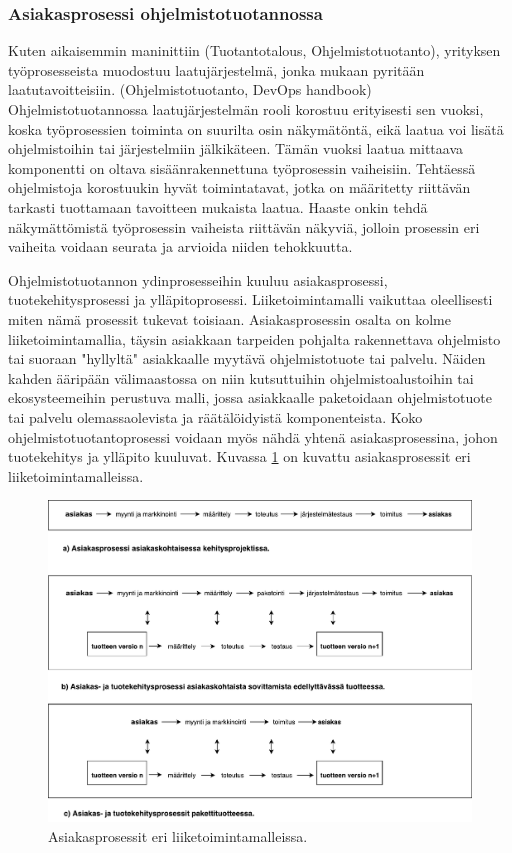\documentclass[finnish,12pt,a4paper,pdftex]{article}
\begin{document}
\subsubsection{Asiakasprosessi ohjelmistotuotannossa}

Kuten aikaisemmin maninittiin (Tuotantotalous, Ohjelmistotuotanto), yrityksen työprosesseista muodostuu laatujärjestelmä, jonka mukaan pyritään laatutavoitteisiin. (Ohjelmistotuotanto, DevOps handbook) Ohjelmistotuotannossa laatujärjestelmän rooli korostuu erityisesti sen vuoksi, koska työprosessien toiminta on suurilta osin näkymätöntä, eikä laatua voi lisätä ohjelmistoihin tai järjestelmiin jälkikäteen. Tämän vuoksi laatua mittaava komponentti on oltava sisäänrakennettuna työprosessin vaiheisiin. Tehtäessä ohjelmistoja korostuukin hyvät toimintatavat, jotka on määritetty riittävän tarkasti tuottamaan tavoitteen mukaista laatua. Haaste onkin tehdä näkymättömistä työprosessin vaiheista riittävän näkyviä, jolloin prosessin eri vaiheita voidaan seurata ja arvioida niiden tehokkuutta. 

Ohjelmistotuotannon ydinprosesseihin kuuluu asiakasprosessi, tuotekehitysprosessi ja ylläpitoprosessi. Liiketoimintamalli vaikuttaa oleellisesti miten nämä prosessit tukevat toisiaan. Asiakasprosessin osalta on kolme liiketoimintamallia, täysin asiakkaan tarpeiden pohjalta rakennettava ohjelmisto tai suoraan "hyllyltä" asiakkaalle myytävä ohjelmistotuote tai palvelu. Näiden kahden ääripään välimaastossa on niin kutsuttuihin ohjelmistoalustoihin tai ekosysteemeihin perustuva malli, jossa asiakkaalle paketoidaan ohjelmistotuote tai palvelu olemassaolevista ja räätälöidyistä komponenteista. Koko ohjelmistotuotantoprosessi voidaan myös nähdä yhtenä asiakasprosessina, johon tuotekehitys ja ylläpito kuuluvat. Kuvassa \ref{fig:asiakasprosessi} on kuvattu asiakasprosessit eri liiketoimintamalleissa.

\begin{figure}[!h]
    \centering
    \includegraphics[scale=0.45]{asiakasprosessi.pdf}
    \caption{Asiakasprosessit eri liiketoimintamalleissa.}
    \label{fig:asiakasprosessi}
\end{figure}
\end{document}
